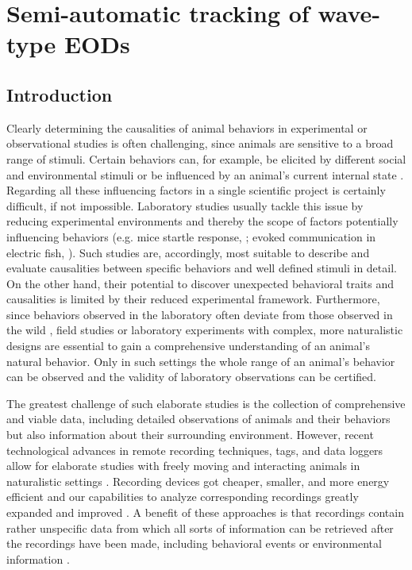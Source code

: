 \chapter{Semi-automatic tracking of wave-type EODs}
\label{Methods}

\section{Introduction}

Clearly determining the causalities of animal behaviors in experimental or observational studies is often challenging, since animals are sensitive to a broad range of stimuli. Certain behaviors can, for example, be elicited by different social and environmental stimuli or be influenced by an animal's current internal state \citep{Chapman1995, Sapolsky2005, Boon2007, Markham2015}. Regarding all these influencing factors in a single scientific project is certainly difficult, if not impossible. Laboratory studies usually tackle this issue by reducing experimental environments and thereby the scope of factors potentially influencing behaviors (e.g. mice startle response, \citealp{Pantoni2020}; evoked communication in electric fish, \citealp{Bastianetal2001}). Such studies are, accordingly, most suitable to describe and evaluate causalities between specific behaviors and well defined stimuli in detail. On the other hand, their potential to discover unexpected behavioral traits and causalities is limited by their reduced experimental framework. Furthermore, since behaviors observed in the laboratory often deviate from those observed in the wild \citep{Cheney1995, Rendall1999, Henninger2018}, field studies or laboratory experiments with complex, more naturalistic designs are essential to gain a comprehensive understanding of an animal's natural behavior. Only in such settings the whole range of an animal's behavior can be observed and the validity of laboratory observations can be certified. 

The greatest challenge of such elaborate studies is the collection of comprehensive and viable data, including detailed observations of animals and their behaviors but also information about their surrounding environment. However, recent technological advances in remote recording techniques, tags, and data loggers allow for elaborate studies with freely moving and interacting animals in naturalistic settings \citep{Hughey2018, Mathis2018}. Recording devices got cheaper, smaller, and more energy efficient \citep{Hughey2018, Jolles2021} and our capabilities to analyze corresponding recordings greatly expanded and improved \citep{Dell2014}. A benefit of these approaches is that recordings contain rather unspecific data from which all sorts of information can be retrieved after the recordings have been made, including behavioral events or environmental information \citep{Gomez2014}. 

